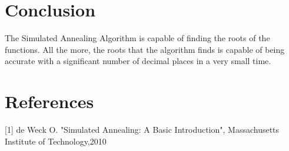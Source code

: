 \documentclass{acm_proc_article-sp}
\begin{document}
\section{Conclusion}
The Simulated Annealing Algorithm is capable of finding the roots of the functions. All the more, the roots that the algorithm finds is capable of being accurate with a significant number of decimal places in a very small time. 

\section{References}
[1] de Weck O. "Simulated Annealing: A Basic Introduction", Massachusetts Institute of Technology,2010 
\end{document}
